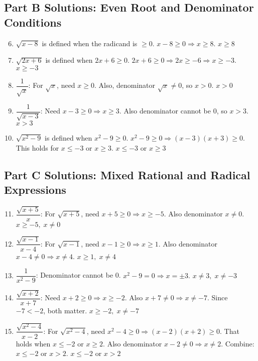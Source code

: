 \documentclass[12pt]{article}
\begin{document}
\subsection*{Part B Solutions: Even Root and Denominator Conditions}
\begin{enumerate}
  \setcounter{enumi}{5}
  \item \(\sqrt{x - 8}\) is defined when the radicand is \(\ge 0\).  
  \(x - 8 \ge 0 \Rightarrow x \ge 8.\)  
  \(\boxed{x \ge 8}\)

  \item \(\sqrt{2x + 6}\) is defined when \(2x + 6 \ge 0.\)  
  \(2x + 6 \ge 0 \Rightarrow 2x \ge -6 \Rightarrow x \ge -3.\)  
  \(\boxed{x \ge -3}\)

  \item \(\dfrac{1}{\sqrt{x}}\):  
  For \(\sqrt{x}\), need \(x \ge 0\).  
  Also, denominator \(\sqrt{x} \ne 0\), so \(x > 0.\)  
  \(\boxed{x > 0}\)

  \item \(\dfrac{1}{\sqrt{x - 3}}\):  
  Need \(x - 3 \ge 0 \Rightarrow x \ge 3.\)  
  Also denominator cannot be 0, so \(x > 3.\)  
  \(\boxed{x > 3}\)

  \item \(\sqrt{x^2 - 9}\) is defined when \(x^2 - 9 \ge 0.\)  
  \(x^2 - 9 \ge 0 \Rightarrow (x - 3)(x + 3) \ge 0.\)  
  This holds for \(x \le -3\) or \(x \ge 3.\)  
  \(\boxed{x \le -3 \text{ or } x \ge 3}\)
\end{enumerate}

\subsection*{Part C Solutions: Mixed Rational and Radical Expressions}
\begin{enumerate}
  \setcounter{enumi}{10}
  \item \(\dfrac{\sqrt{x + 5}}{x}\):  
  For \(\sqrt{x+5}\), need \(x + 5 \ge 0 \Rightarrow x \ge -5.\)  
  Also denominator \(x \ne 0.\)  
  \(\boxed{x \ge -5,\; x \ne 0}\)

  \item \(\dfrac{\sqrt{x - 1}}{x - 4}\):  
  For \(\sqrt{x-1}\), need \(x - 1 \ge 0 \Rightarrow x \ge 1.\)  
  Also denominator \(x - 4 \ne 0 \Rightarrow x \ne 4.\)  
  \(\boxed{x \ge 1,\; x \ne 4}\)

  \item \(\dfrac{1}{x^2 - 9}\):  
  Denominator cannot be 0.  
  \(x^2 - 9 = 0 \Rightarrow x = \pm 3.\)  
  \(\boxed{x \ne 3,\; x \ne -3}\)

  \item \(\dfrac{\sqrt{x + 2}}{x + 7}\):  
  Need \(x + 2 \ge 0 \Rightarrow x \ge -2.\)  
  Also \(x + 7 \ne 0 \Rightarrow x \ne -7.\)  
  Since \(-7 < -2\), both matter.  
  \(\boxed{x \ge -2,\; x \ne -7}\)

  \item \(\dfrac{\sqrt{x^2 - 4}}{x - 2}\):  
  For \(\sqrt{x^2 - 4}\), need \(x^2 - 4 \ge 0 \Rightarrow (x-2)(x+2) \ge 0.\)  
  That holds when \(x \le -2\) or \(x \ge 2.\)  
  Also denominator \(x - 2 \ne 0 \Rightarrow x \ne 2.\)  
  Combine: \(x \le -2\) or \(x > 2.\)  
  \(\boxed{x \le -2 \text{ or } x > 2}\)
\end{enumerate}
\end{document}
